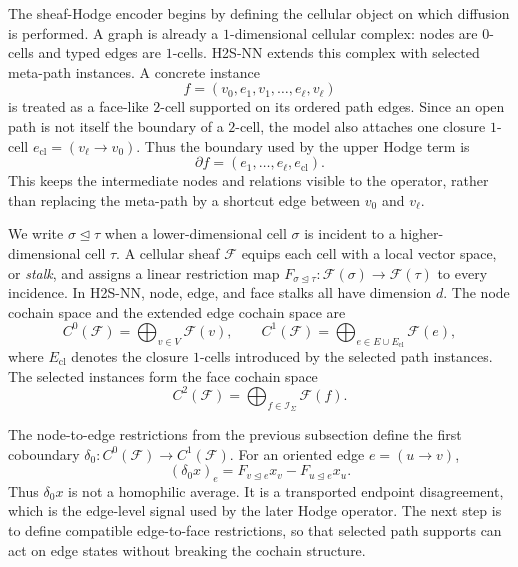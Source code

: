 \documentclass[sigconf,anonymous,review]{acmart}
\newcommand{\method}{\textsc{H2S-NN}}
\newcommand{\cF}{\mathcal{F}}
\begin{document}
The sheaf-Hodge encoder begins by defining the cellular object on which diffusion is performed.
A graph is already a \(1\)-dimensional cellular complex: nodes are \(0\)-cells and typed edges are
\(1\)-cells.  \method{} extends this complex with selected meta-path instances.  A concrete
instance
\[
  f=(v_0,e_1,v_1,\ldots,e_\ell,v_\ell)
\]
is treated as a face-like \(2\)-cell supported on its ordered path edges.  Since an open path is not
itself the boundary of a \(2\)-cell, the model also attaches one closure \(1\)-cell
\(e_{\mathrm{cl}}=(v_\ell\rightarrow v_0)\).  Thus the boundary used by the upper Hodge term is
\[
  \partial f=(e_1,\ldots,e_\ell,e_{\mathrm{cl}}).
\]
This keeps the intermediate nodes and relations visible to the operator, rather than replacing the
meta-path by a shortcut edge between \(v_0\) and \(v_\ell\).

We write \(\sigma\unlhd\tau\) when a lower-dimensional cell \(\sigma\) is incident to a
higher-dimensional cell \(\tau\).  A cellular sheaf \(\cF\) equips each cell with a local vector
space, or \emph{stalk}, and assigns a linear restriction map
\(F_{\sigma\unlhd\tau}:\cF(\sigma)\rightarrow\cF(\tau)\) to every incidence.  In \method{}, node,
edge, and face stalks all have dimension \(d\).  The node cochain space and the extended edge
cochain space are
\begin{equation}
  C^0(\cF)=\bigoplus_{v\in V}\cF(v),
  \qquad
  C^1(\cF)=\bigoplus_{e\in E\cup E_{\mathrm{cl}}}\cF(e),
\end{equation}
where \(E_{\mathrm{cl}}\) denotes the closure \(1\)-cells introduced by the selected path
instances.  The selected instances form the face cochain space
\begin{equation}
  C^2(\cF)=\bigoplus_{f\in\mathcal{I}_{\Sigma}}\cF(f).
\end{equation}

The node-to-edge restrictions from the previous subsection define the first coboundary
\(\delta_0:C^0(\cF)\rightarrow C^1(\cF)\).  For an oriented edge \(e=(u\rightarrow v)\),
\begin{equation}
  (\delta_0x)_e
  =
  F_{v\unlhd e}x_v-F_{u\unlhd e}x_u .
  \label{eq:background-delta0}
\end{equation}
Thus \(\delta_0x\) is not a homophilic average.  It is a transported endpoint disagreement, which
is the edge-level signal used by the later Hodge operator.  The next step is to define compatible
edge-to-face restrictions, so that selected path supports can act on edge states without breaking
the cochain structure.
\end{document}
